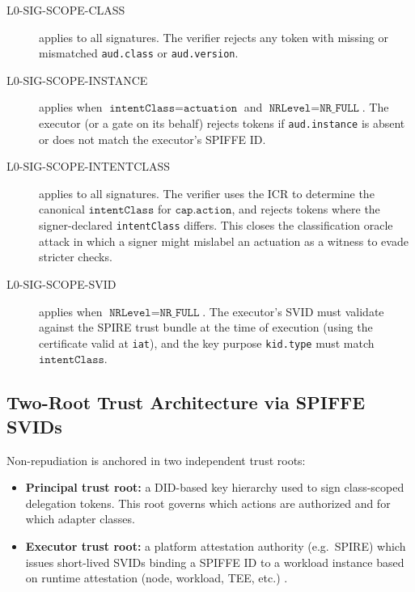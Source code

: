 \documentclass[11pt]{article}
\begin{document}
\begin{description}
  \item[L0-SIG-SCOPE-CLASS] applies to all signatures. The verifier
    rejects any token with missing or mismatched \texttt{aud.class}
    or \texttt{aud.version}.

  \item[L0-SIG-SCOPE-INSTANCE] applies when
    \(\texttt{intentClass} = \texttt{actuation}\) and
    \(\texttt{NRLevel} = \texttt{NR\_FULL}\). The executor (or a
    gate on its behalf) rejects tokens if \texttt{aud.instance}
    is absent or does not match the executor's SPIFFE ID.

  \item[L0-SIG-SCOPE-INTENTCLASS] applies to all signatures. The
    verifier uses the ICR to determine the canonical
    \(\texttt{intentClass}\) for \(\texttt{cap.action}\), and rejects
    tokens where the signer-declared \texttt{intentClass} differs.
    This closes the classification oracle attack in which a signer
    might mislabel an actuation as a witness to evade stricter
    checks.

  \item[L0-SIG-SCOPE-SVID] applies when
    \(\texttt{NRLevel} = \texttt{NR\_FULL}\). The executor's SVID
    must validate against the SPIRE trust bundle at the time of
    execution (using the certificate valid at \texttt{iat}), and
    the key purpose \texttt{kid.type} must match
    \(\texttt{intentClass}\).
\end{description}

\subsection{Two-Root Trust Architecture via SPIFFE SVIDs}

Non-repudiation is anchored in two independent trust roots:

\begin{itemize}
  \item \textbf{Principal trust root:} a DID-based key hierarchy
        used to sign class-scoped delegation tokens. This root governs
        which actions are authorized and for which adapter classes.

  \item \textbf{Executor trust root:} a platform attestation authority
        (e.g.\ SPIRE) which issues short-lived SVIDs binding a
        SPIFFE ID to a workload instance based on runtime attestation
        (node, workload, TEE, etc.) \cite{web:77,web:90,web:104}.
\end{itemize}
\end{document}
